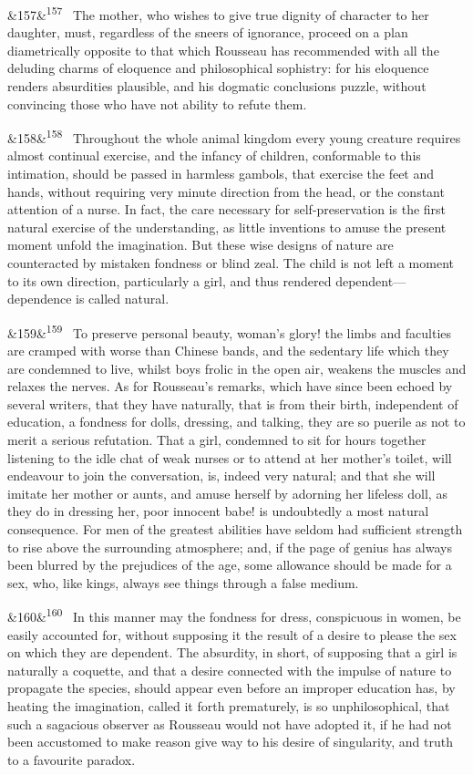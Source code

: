 \documentclass[12pt]{article}
\newcommand{\para}[1][]{\par\noindent\ifx&#1&\else\textsuperscript{\footnotesize #1}~\fi}
\begin{document}
\para[157] The mother, who wishes to give true dignity of character to her daughter, must, regardless of the sneers of ignorance, proceed on a plan diametrically opposite to that which Rousseau has recommended with all the deluding charms of eloquence and philosophical sophistry: for his eloquence renders absurdities plausible, and his dogmatic conclusions puzzle, without convincing those who have not ability to refute them.

\para[158] Throughout the whole animal kingdom every young creature requires almost continual exercise, and the infancy of children, conformable to this intimation, should be passed in harmless gambols, that exercise the feet and hands, without requiring very minute direction from the head, or the constant attention of a nurse. In fact, the care necessary for self-preservation is the first natural exercise of the understanding, as little inventions to amuse the present moment unfold the imagination. But these wise designs of nature are counteracted by mistaken fondness or blind zeal. The child is not left a moment to its own direction, particularly a girl, and thus rendered dependent---dependence is called natural.

\para[159] To preserve personal beauty, woman's glory! the limbs and faculties are cramped with worse than Chinese bands, and the sedentary life which they are condemned to live, whilst boys frolic in the open air, weakens the muscles and relaxes the nerves. As for Rousseau's remarks, which have since been echoed by several writers, that they have naturally, that is from their birth, independent of education, a fondness for dolls, dressing, and talking, they are so puerile as not to merit a serious refutation. That a girl, condemned to sit for hours together listening to the idle chat of weak nurses or to attend at her mother's toilet, will endeavour to join the conversation, is, indeed very natural; and that she will imitate her mother or aunts, and amuse herself by adorning her lifeless doll, as they do in dressing her, poor innocent babe! is undoubtedly a most natural consequence. For men of the greatest abilities have seldom had sufficient strength to rise above the surrounding atmosphere; and, if the page of genius has always been blurred by the prejudices of the age, some allowance should be made for a sex, who, like kings, always see things through a false medium.

\para[160] In this manner may the fondness for dress, conspicuous in women, be easily accounted for, without supposing it the result of a desire to please the sex on which they are dependent. The absurdity, in short, of supposing that a girl is naturally a coquette, and that a desire connected with the impulse of nature to propagate the species, should appear even before an improper education has, by heating the imagination, called it forth prematurely, is so unphilosophical, that such a sagacious observer as Rousseau would not have adopted it, if he had not been accustomed to make reason give way to his desire of singularity, and truth to a favourite paradox.
\end{document}
